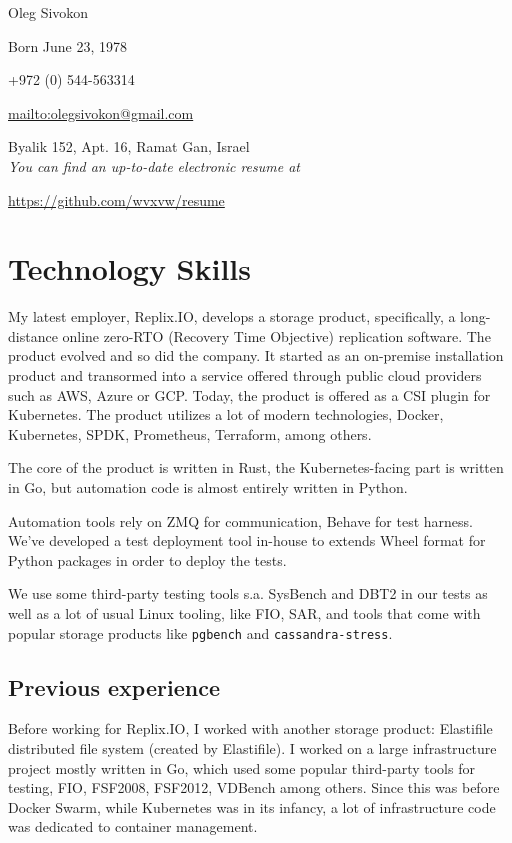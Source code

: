 \documentclass[11pt]{article}
\author{Oleg Sivokon}
\date{\textit{<2019-07-24 Wed>}}
\title{}
\begin{document}
\begin{center}
Oleg Sivokon

Born June 23, 1978

+972 (0) 544-563314

\url{mailto:olegsivokon@gmail.com}

Byalik 152, Apt. 16, Ramat Gan, Israel \\[18pt]

\small \emph{You can find an up-to-date electronic resume at}

\url{https://github.com/wvxvw/resume} \\[48pt]
\end{center}

\section*{Technology Skills}
\label{sec:org3c97984}
My latest employer, Replix.IO, develops a storage product,
specifically, a long-distance online zero-RTO (Recovery Time
Objective) replication software.  The product evolved and so did the
company.  It started as an on-premise installation product and
transormed into a service offered through public cloud providers
such as AWS, Azure or GCP.  Today, the product is offered as a CSI
plugin for Kubernetes.  The product utilizes a lot of modern
technologies, Docker, Kubernetes, SPDK, Prometheus, Terraform, among
others.

The core of the product is written in Rust, the Kubernetes-facing
part is written in Go, but automation code is almost entirely
written in Python.

Automation tools rely on ZMQ for communication, Behave for test
harness.  We've developed a test deployment tool in-house to extends
Wheel format for Python packages in order to deploy the tests.

We use some third-party testing tools s.a. SysBench and DBT2 in our
tests as well as a lot of usual Linux tooling, like FIO, SAR, and
tools that come with popular storage products like \texttt{pgbench} and
\texttt{cassandra-stress}.

\subsection*{Previous experience}
\label{sec:org9f75cdb}
Before working for Replix.IO, I worked with another storage
product: Elastifile distributed file system (created by
Elastifile).  I worked on a large infrastructure project mostly
written in Go, which used some popular third-party tools for
testing, FIO, FSF2008, FSF2012, VDBench among others.  Since this
was before Docker Swarm, while Kubernetes was in its infancy, a lot
of infrastructure code was dedicated to container management.
\end{document}

